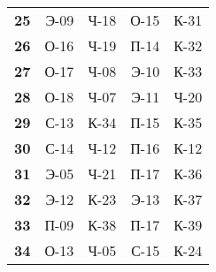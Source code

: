 \documentclass[12pt]{article}
\begin{document}
\begin{multicols}{3}
\begin{tabular}{c|rrrr}
\textbf{25} & {Э-09} & {Ч-18} & {О-15} & {К-31} \\
\textbf{26} & {О-16} & {Ч-19} & {П-14} & {К-32} \\
\textbf{27} & {О-17} & {Ч-08} & {Э-10} & {К-33} \\
\textbf{28} & {О-18} & {Ч-07} & {Э-11} & {Ч-20} \\
\textbf{29} & {С-13} & {К-34} & {П-15} & {К-35} \\
\textbf{30} & {С-14} & {Ч-12} & {П-16} & {К-12} \\
\textbf{31} & {Э-05} & {Ч-21} & {П-17} & {К-36} \\
\textbf{32} & {Э-12} & {К-23} & {Э-13} & {К-37} \\
\textbf{33} & {П-09} & {К-38} & {П-17} & {К-39} \\
\textbf{34} & {О-13} & {Ч-05} & {С-15} & {К-24} \\
\end{tabular}

\end{multicols}

\clearpage

%
%
\setcounter{tocdepth}{1}
\tableofcontents
%
%
\end{document}
